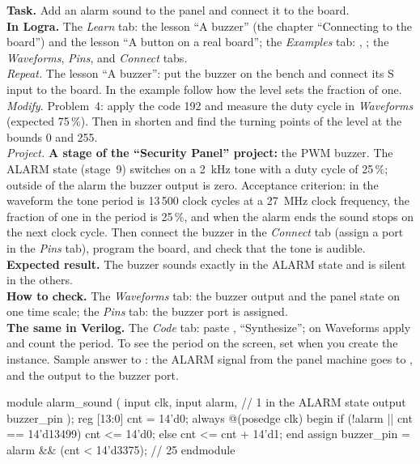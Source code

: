 \begin{diybox}
\textbf{Task.} Add an alarm sound to the panel and connect it to the
board.\\
\textbf{In Logra.} The \emph{Learn} tab: the lesson ``A buzzer'' (the chapter ``Connecting to the
board'') and the lesson ``A button on a real board''; the \emph{Examples} tab: ,
; the \emph{Waveforms}, \emph{Pins}, and \emph{Connect} tabs.\\
 \emph{Repeat.} The lesson ``A buzzer'': put the buzzer on the bench and connect
its S input to the board. In the  example follow how the level sets the fraction of
one.\\
 \emph{Modify.} Problem~4: apply the code 192 and measure the duty cycle in
\emph{Waveforms} (expected 75\,\%). Then in  shorten
 and find the turning points of the level at the bounds 0 and 255.\\
 \emph{Project.} \textbf{A stage of the ``Security Panel'' project:} the PWM
buzzer. The ALARM state (stage~9) switches on a 2~kHz tone with a duty cycle of 25\,\%;
outside of the alarm the buzzer output is zero. Acceptance criterion: in the waveform the
tone period is 13\,500 clock cycles at a 27~MHz clock frequency, the fraction of one
in the period is 25\,\%, and when the alarm ends the sound stops on the
next clock cycle. Then connect the buzzer in the \emph{Connect} tab
(assign a port in the \emph{Pins} tab), program the board, and check that the tone
is audible.\\
\textbf{Expected result.} The buzzer sounds exactly in the ALARM state and
is silent in the others.\\
\textbf{How to check.} The \emph{Waveforms} tab: the buzzer output and the panel state
on one time scale; the \emph{Pins} tab: the buzzer port is assigned.\\
\textbf{The same in Verilog.} The \emph{Code} tab: paste ,
``Synthesize''; on Waveforms apply  and count the period. To see
the period on the screen, set  when you
create the instance. Sample answer to : the ALARM signal from the panel
machine goes to , and the output to the buzzer port.
\end{diybox}

\begin{vcode}
module alarm_sound (
    input  clk,
    input  alarm,                // 1 in the ALARM state
    output buzzer_pin
);
    reg [13:0] cnt = 14'd0;
    always @(posedge clk) begin
        if (!alarm || cnt == 14'd13499) cnt <= 14'd0;
        else                            cnt <= cnt + 14'd1;
    end
    assign buzzer_pin = alarm && (cnt < 14'd3375);   // 25 %
endmodule
\end{vcode}


